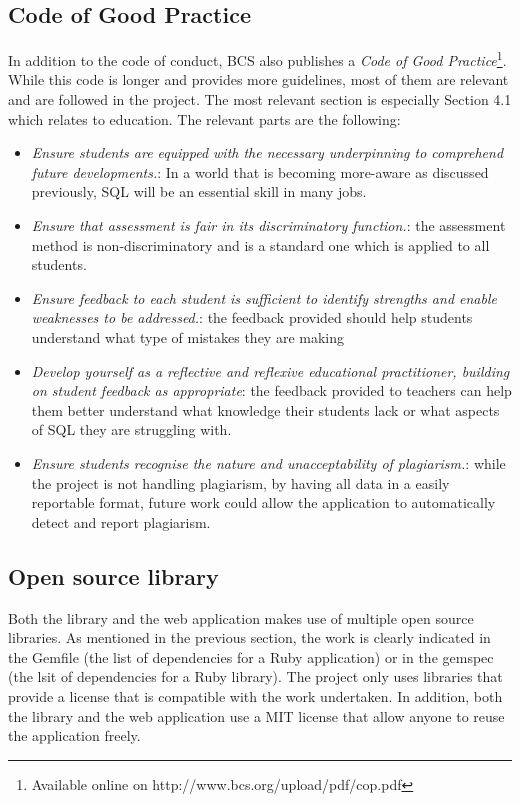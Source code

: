 \subsection{Code of Good Practice}

In addition to the code of conduct, BCS also publishes a \textit{Code of Good Practice}\footnote{Available online on http://www.bcs.org/upload/pdf/cop.pdf}. While this code is longer and provides more guidelines, most of them are relevant and are followed in the project. The most relevant section is especially Section 4.1 which relates to education. The relevant parts are the following:

\begin{itemize}
    \item \textit{Ensure students are equipped with the necessary underpinning to comprehend future developments.}: In a world that is becoming more-aware as discussed previously, SQL will be an essential skill in many jobs.
    \item \textit{Ensure that assessment is fair in its discriminatory function.}: the assessment method is non-discriminatory and is a standard one which is applied to all students.
    \item \textit{Ensure feedback to each student is sufficient to identify strengths and enable weaknesses to be addressed.}: the feedback provided should help students understand what type of mistakes they are making
    \item \textit{Develop yourself as a reflective and reflexive educational practitioner, building on student feedback as appropriate}: the feedback provided to teachers can help them better understand what knowledge their students lack or what aspects of SQL they are struggling with.
    \item \textit{Ensure students recognise the nature and unacceptability of plagiarism.}: while the project is not handling plagiarism, by having all data in a easily reportable format, future work could allow the application to automatically detect and report plagiarism.
\end{itemize}

\subsection{Open source library}

Both the library and the web application makes use of multiple open source libraries. As mentioned in the previous section, the work is clearly indicated in the Gemfile (the list of dependencies for a Ruby application) or in the gemspec (the lsit of dependencies for a Ruby library). The project only uses libraries that provide a license that is compatible with the work undertaken. In addition, both the library and the web application use a MIT license that allow anyone to reuse the application freely.

